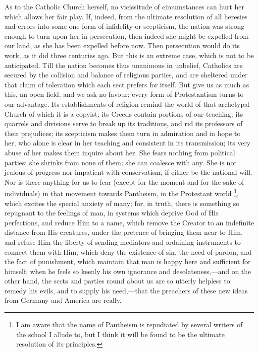 As to the Catholic Church herself, no vicissitude of circumstances
can hurt her which allows her fair play. If, indeed, from the ultimate
resolution of all heresies and errors into some one form of infidelity
or scepticism, the nation was strong enough to turn upon her in
persecution, then indeed she might be expelled from our land, as she
has been expelled before now. Then persecution would do its work, as
it did three centuries ago. But this is an extreme case, which is not
to be anticipated. Till the nation becomes thus unanimous in unbelief,
Catholics are secured by the collision and balance of religious
parties, and are sheltered under that claim of toleration which each
sect prefers for itself. But give us as much as this, an open field,
and we ask no favour; every form of Protestantism turns to our
advantage. Its establishments of religion remind the world of that
archetypal Church of which it is a copyist; its Creeds contain
portions of our teaching; its quarrels and divisions serve to break up
its traditions, and rid its professors of their prejudices; its
scepticism makes them turn in admiration and in hope to her, who alone
is clear in her teaching and consistent in its transmission; its very
abuse of her makes them inquire about her. She fears nothing from
political parties; she shrinks from none of them; she can coalesce
with any. She is not jealous of progress nor impatient with
conservatism, if either be the national will. Nor is there anything
for us to fear (except for the moment and for the sake of individuals)
in that movement towards Pantheism, in the Protestant world \footnote{I am aware that the name of Pantheism is
repudiated by several writers of the school I allude to, but I think
it will be found to be the ultimate resolution of its principles.},
which excites the special anxiety of many; for, in truth, there is
something so repugnant to the feelings of man, in systems which
deprive God of His perfections, and reduce Him to a name, which remove
the Creator to an indefinite distance from His creatures, under the
pretence of bringing them near to Him, and refuse Him the liberty of
sending mediators and ordaining instruments to connect them with Him,
which deny the existence of sin, the need of pardon, and the fact of
punishment, which maintain that man is happy here and sufficient for
himself, when he feels so keenly his own ignorance and desolateness,—and
on the other hand, the sects and parties round about us are so utterly
helpless to remedy his evils, and to supply his need,—that the
preachers of these new ideas from Germany and America are really,
